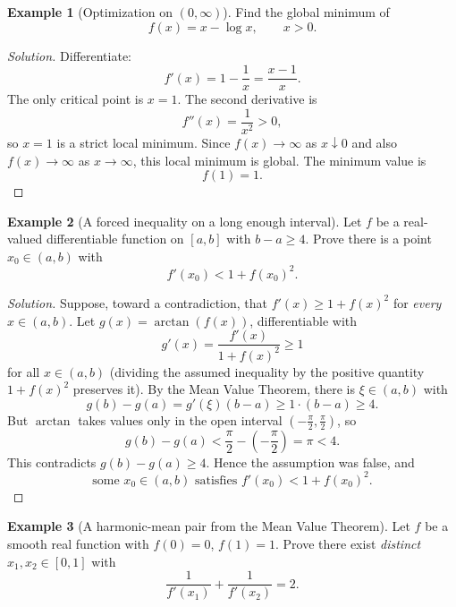 \documentclass[11pt]{article}
\theoremstyle{definition}
\newtheorem{example}{Example}[section]
\begin{document}
\begin{example}[Optimization on $(0,\infty)$]
Find the global minimum of
\[
f(x)=x-\log x, \qquad x>0.
\]
\end{example}

\begin{proof}[Solution]
Differentiate:
\[
f'(x)=1-\frac1x = \frac{x-1}{x}.
\]
The only critical point is $x=1$. The second derivative is
\[
f''(x)=\frac{1}{x^2}>0,
\]
so $x=1$ is a strict local minimum. Since $f(x)\to\infty$ as $x\downarrow 0$ and also $f(x)\to\infty$ as $x\to\infty$, this local minimum is global. The minimum value is
\[
f(1)=1.
\]
\end{proof}

\begin{example}[A forced inequality on a long enough interval]
Let $f$ be a real-valued differentiable function on $[a,b]$ with $b-a\ge4$. Prove there is a point $x_0\in(a,b)$ with
\[
f'(x_0) < 1+f(x_0)^2.
\]
\end{example}

\begin{proof}[Solution]
Suppose, toward a contradiction, that $f'(x)\ge 1+f(x)^2$ for \emph{every} $x\in(a,b)$. Let $g(x)=\arctan(f(x))$, differentiable with
\[
g'(x)=\frac{f'(x)}{1+f(x)^2}\ge1
\]
for all $x\in(a,b)$ (dividing the assumed inequality by the positive quantity $1+f(x)^2$ preserves it). By the Mean Value Theorem, there is $\xi\in(a,b)$ with
\[
g(b)-g(a)=g'(\xi)(b-a) \ge 1\cdot(b-a) \ge 4.
\]
But $\arctan$ takes values only in the open interval $\left(-\tfrac\pi2,\tfrac\pi2\right)$, so
\[
g(b)-g(a) < \frac\pi2-\left(-\frac\pi2\right)=\pi < 4.
\]
This contradicts $g(b)-g(a)\ge4$. Hence the assumption was false, and
\[
\boxed{\text{some } x_0\in(a,b) \text{ satisfies } f'(x_0)<1+f(x_0)^2}.
\]
\end{proof}

\begin{example}[A harmonic-mean pair from the Mean Value Theorem]
Let $f$ be a smooth real function with $f(0)=0$, $f(1)=1$. Prove there exist \emph{distinct} $x_1,x_2\in[0,1]$ with
\[
\frac1{f'(x_1)}+\frac1{f'(x_2)}=2.
\]
\end{example}
\end{document}
